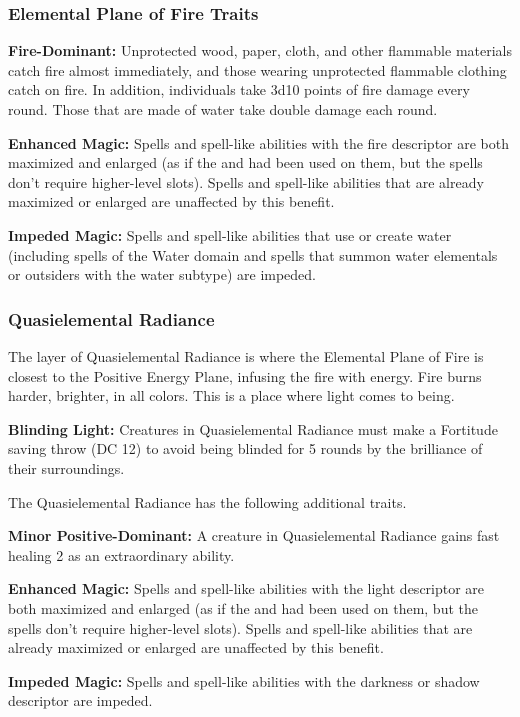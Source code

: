 \subsubsection{Elemental Plane of Fire Traits}
\begin{itemize*}
\item \textbf{Fire-Dominant:} Unprotected wood, paper, cloth, and other flammable materials catch fire almost immediately, and those wearing unprotected flammable clothing catch on fire. In addition, individuals take 3d10 points of fire damage every round. Those that are made of water take double damage each round.
\item \textbf{Enhanced Magic:} Spells and spell-like abilities with the fire descriptor are both maximized and enlarged (as if the  and  had been used on them, but the spells don't require higher-level slots). Spells and spell-like abilities that are already maximized or enlarged are unaffected by this benefit.
\item \textbf{Impeded Magic:} Spells and spell-like abilities that use or create water (including spells of the Water domain and spells that summon water elementals or outsiders with the water subtype) are impeded.
\end{itemize*}


\subsubsection{Quasielemental Radiance}
The layer of Quasielemental Radiance is where the Elemental Plane of Fire is closest to the Positive Energy Plane, infusing the fire with energy. Fire burns harder, brighter, in all colors. This is a place where light comes to being.

\textbf{Blinding Light:} Creatures in Quasielemental Radiance must make a Fortitude saving throw (DC 12) to avoid being blinded for 5 rounds by the brilliance of their surroundings.

The Quasielemental Radiance has the following additional traits.
\begin{itemize*}
\item \textbf{Minor Positive-Dominant:} A creature in Quasielemental Radiance gains fast healing 2 as an extraordinary ability.
\item \textbf{Enhanced Magic:} Spells and spell-like abilities with the light descriptor are both maximized and enlarged (as if the  and  had been used on them, but the spells don't require higher-level slots). Spells and spell-like abilities that are already maximized or enlarged are unaffected by this benefit.
\item \textbf{Impeded Magic:} Spells and spell-like abilities with the darkness or shadow descriptor are impeded.
\end{itemize*}

